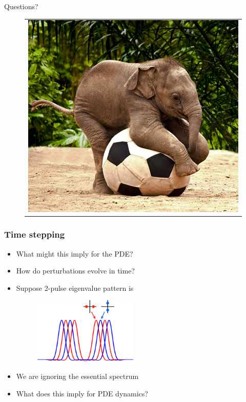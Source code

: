 \documentclass[16pt]{beamer}
\begin{document}
\begin{frame}
	\fontsize{16}{7.2}\selectfont
\begin{center}
		Questions?

		\begin{figure}[H]
		\begin{tabular}{c}
		\includegraphics[width=0.65\linewidth]{images/babyelephant4.jpg} 
		\end{tabular}
		\end{figure}

	\end{center}
\end{frame}

\begin{frame}
	\frametitle{Time stepping}
	\fontsize{14}{7.2}\selectfont
	\begin{itemize}
		\item What might this imply for the PDE?
		\item How do perturbations evolve in time?
		\item Suppose 2-pulse eigenvalue pattern is
		\begin{figure}
		\begin{center}
		\includegraphics[width=5cm]{images/DPeigpattern.eps}
		\end{center}
		\end{figure}
		\item We are ignoring the essential spectrum
		\item What does this imply for PDE dynamics?
	\end{itemize}
\end{frame}
\end{document}
